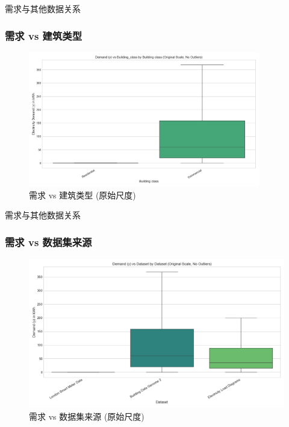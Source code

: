 \documentclass{beamer} %
\begin{document}
\begin{frame}{需求与其他数据关系}
    \frametitle{需求 vs 建筑类型}
    \begin{figure}[H]
        \centering
        \includegraphics[width=0.9\textwidth]{../plots/demand_vs_building_class_boxplot_orig.png}
        \caption{需求 vs 建筑类型 (原始尺度)}
    \end{figure}
\end{frame}

\begin{frame}{需求与其他数据关系}
    \frametitle{需求 vs 数据集来源}
    \begin{figure}[H]
        \centering
        \includegraphics[width=\textwidth]{../plots/demand_vs_dataset_boxplot_orig.png}
        \caption{需求 vs 数据集来源 (原始尺度)}
    \end{figure}
\end{frame}
\end{document}
